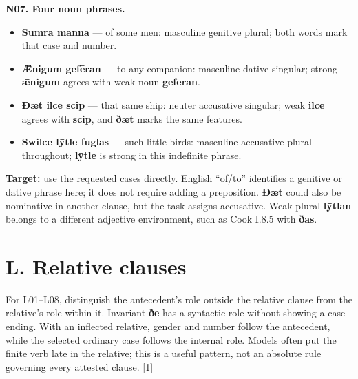 \par\begin{minipage}{\linewidth}\raggedright
\textbf{N07. Four noun phrases.}

\begin{itemize}
\item \textbf{Sumra manna} — of some men: masculine genitive plural; both words mark that case and number.
\item \textbf{Ǣnigum gefēran} — to any companion: masculine dative singular; strong \textbf{ǣnigum} agrees with weak noun \textbf{gefēran}.
\item \textbf{Ðæt ilce scip} — that same ship: neuter accusative singular; weak \textbf{ilce} agrees with \textbf{scip}, and \textbf{ðæt} marks the same features.
\item \textbf{Swilce lȳtle fuglas} — such little birds: masculine accusative plural throughout; \textbf{lȳtle} is strong in this indefinite phrase.
\end{itemize}

\textbf{Target:} use the requested cases directly. English “of/\allowbreak{}to” identifies a genitive or dative phrase here; it does not require adding a preposition. \textbf{Ðæt} could also be nominative in another clause, but the task assigns accusative. Weak plural \textbf{lȳtlan} belongs to a different adjective environment, such as Cook I.8.5 with \textbf{ðās}.

\end{minipage}\par\addvspace{4pt}

\section*{L. Relative clauses}

For L01–L08, distinguish the antecedent's role outside the relative clause from the relative's role within it. Invariant \textbf{ðe} has a syntactic role without showing a case ending. With an inflected relative, gender and number follow the antecedent, while the selected ordinary case follows the internal role. Models often put the finite verb late in the relative; this is a useful pattern, not an absolute rule governing every attested clause. [1]

